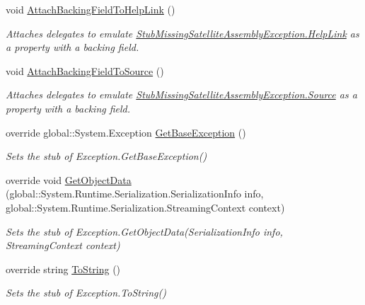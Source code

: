 \begin{DoxyCompactItemize}
void \hyperlink{class_system_1_1_resources_1_1_fakes_1_1_stub_missing_satellite_assembly_exception_ac092e1051ff24090be1d4782917febd8}{Attach\-Backing\-Field\-To\-Help\-Link} ()
\begin{DoxyCompactList}\small\item\em Attaches delegates to emulate \hyperlink{class_system_1_1_resources_1_1_fakes_1_1_stub_missing_satellite_assembly_exception_aa59cc3c39bc7c220d4ffd869183bb4bd}{Stub\-Missing\-Satellite\-Assembly\-Exception.\-Help\-Link} as a property with a backing field.\end{DoxyCompactList}\item 
void \hyperlink{class_system_1_1_resources_1_1_fakes_1_1_stub_missing_satellite_assembly_exception_abbe9691e22974cc01bb02001c18cbb85}{Attach\-Backing\-Field\-To\-Source} ()
\begin{DoxyCompactList}\small\item\em Attaches delegates to emulate \hyperlink{class_system_1_1_resources_1_1_fakes_1_1_stub_missing_satellite_assembly_exception_a7bea3b9f18181441c7e9a3e88226ce0c}{Stub\-Missing\-Satellite\-Assembly\-Exception.\-Source} as a property with a backing field.\end{DoxyCompactList}\item 
override global\-::\-System.\-Exception \hyperlink{class_system_1_1_resources_1_1_fakes_1_1_stub_missing_satellite_assembly_exception_a8646233f56c58eda8b69bbdd35a0a1d4}{Get\-Base\-Exception} ()
\begin{DoxyCompactList}\small\item\em Sets the stub of Exception.\-Get\-Base\-Exception()\end{DoxyCompactList}\item 
override void \hyperlink{class_system_1_1_resources_1_1_fakes_1_1_stub_missing_satellite_assembly_exception_ae4f5ff3f697f6a6f277b1c734caaa8ec}{Get\-Object\-Data} (global\-::\-System.\-Runtime.\-Serialization.\-Serialization\-Info info, global\-::\-System.\-Runtime.\-Serialization.\-Streaming\-Context context)
\begin{DoxyCompactList}\small\item\em Sets the stub of Exception.\-Get\-Object\-Data(\-Serialization\-Info info, Streaming\-Context context)\end{DoxyCompactList}\item 
override string \hyperlink{class_system_1_1_resources_1_1_fakes_1_1_stub_missing_satellite_assembly_exception_a984f0891886b2f6465da9a4a6ce6f1b7}{To\-String} ()
\begin{DoxyCompactList}\small\item\em Sets the stub of Exception.\-To\-String()\end{DoxyCompactList}\end{DoxyCompactItemize}
